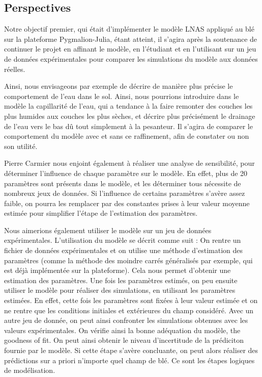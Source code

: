 \subsection{Perspectives}

Notre objectif premier, qui était d'implémenter le modèle LNAS appliqué au blé sur la plateforme Pygmalion-Julia, étant atteint, il s'agira après la soutenance de continuer le projet en affinant le modèle, en l'étudiant et en l'utilisant sur un jeu de données expérimentales pour comparer les simulations du modèle aux données réelles.

Ainsi, nous envisageons par exemple de décrire de manière plus précise le comportement de l'eau dans le sol. Ainsi, nous pourrions introduire dans le modèle la capillarité de l'eau, qui a tendance à la faire remonter des couches les plus humides aux couches les plus sèches, et décrire plus précisément le drainage de l'eau vers le bas dû tout simplement à la pesanteur. Il s'agira de comparer le comportement du modèle avec et sans ce raffinement, afin de constater ou non son utilité.

Pierre Carmier nous enjoint également à réaliser une analyse de sensibilité, pour déterminer l'influence de chaque paramètre sur le modèle. En effet, plus de 20 paramètres sont présents dans le modèle, et les déterminer tous nécessite de nombreux jeux de données. Si l'influence de certains paramètres s'avère assez faible, on pourra les remplacer par des constantes prises à leur valeur moyenne estimée pour simplifier l'étape de l'estimation des paramètres.

Nous aimerions également utiliser le modèle sur un jeu de données expérimentales. L'utilisation du modèle se décrit comme suit : On rentre un fichier de données expérimentales et on utilise une méthode d'estimation des paramètres (comme la méthode des moindre carrés généralisés par exemple, qui est déjà implémentée sur la plateforme). Cela nous permet d'obtenir une estimation des paramètres. 
Une fois les paramètres estimés, on peu ensuite utiliser le modèle pour réaliser des simulations, en utilisant les paramètres estimées. En effet, cette fois les paramètres sont fixées à leur valeur estimée et on ne rentre que les conditions initiales et extérieures du champ considéré.
Avec un autre jeu de donnée, on peut ainsi confronter les simulations obtenues avec les valeurs expérimentales. On vérifie ainsi la bonne adéquation du modèle, the goodness of fit. On peut ainsi obtenir le niveau d'incertitude de la prédiciton fournie par le modèle.
Si cette étape s'avère concluante, on peut alors réaliser des prédictions sur a priori n'importe quel champ de blé. Ce sont les étapes logiques de modélisation. 

